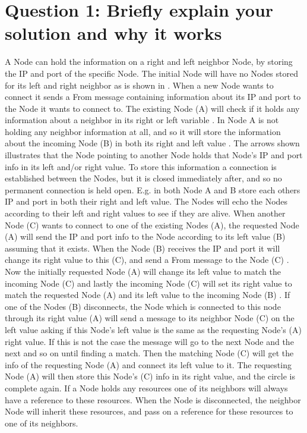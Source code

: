 \section{Question 1: Briefly explain your solution and why it works}
A Node can hold the information on a right and left neighbor Node, by storing the IP and port of the specific Node.
The initial Node will have no Nodes stored for its left and right neighbor as is shown in .
When a new Node wants to connect it sends a From message containing information about its IP and port to the Node it wants to connect to. The existing Node (A) will check if it holds any information about a neighbor in its right or left variable .  
In  Node A is not holding any neighbor information at all, and so it will store the information about the incoming Node (B) in both its right and left value . The arrows shown illustrates that the Node pointing to another Node holds that Node's IP and port info in its left and/or right value. To store this information a connection is established between the Nodes, but it is closed immediately after, and  so no permanent connection is held open. E.g. in  both Node A and B store each others IP and port in both their right and left value. The Nodes will echo the Nodes according to their left and right values to see if they are alive.
When another Node (C) wants to connect to one of the existing Nodes (A), the requested Node (A) will send the IP and port info to the Node according to its left value (B) assuming that it exists. When the Node (B) receives the IP and port it will change its right value to this (C), and send a From message to the Node (C) .
 Now the initially requested Node (A) will change its left value to match the incoming Node (C) and lastly the incoming Node (C) will set its right value to match the requested Node (A) and its left value to the incoming Node (B) .
 \pagebreak
{}
If one of the Nodes (B) disconnects, the Node which is connected to this node through its right value (A) will send a message to its neighbor Node (C) on the left value asking if this Node's left value is the same as the requesting Node's (A) right value. If this is not the case the message will go to the next Node and the next and so on until finding a match. Then the matching Node (C) will get the info of the requesting Node (A) and connect its left value to it. The requesting Node (A) will then store this Node's (C) info in its right value, and the circle is complete again.
If a Node holds any resources one of its neighbors will always have a reference to these resources. When the Node is disconnected, the neighbor Node will inherit these resources, and pass on a reference for these resources to one of its neighbors.

